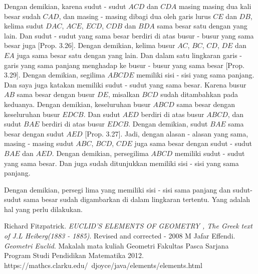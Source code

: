 \documentclass[a4paper]{book}
\begin{document}
Dengan demikian, karena sudut - sudut $ACD$ dan $CDA$ masing masing dua kali
besar  sudah $CAD$, dan masing - masing dibagi dua oleh garis lurus $CE$ dan 
$DB$, kelima sudut $DAC$, $ACE$, $ECD$, $CDB$ dan $BDA$ sama besar satu
dengan yang lain. Dan sudut - sudut yang sama besar berdiri di atas busur -
busur yang sama besar juga [Prop. 3.26]. Dengan demikian, kelima busur $AC$, 
$BC$, $CD$, $DE$ dan $EA$ juga sama besar satu dengan yang lain. Dan dalam 
satu lingkaran garis - garis yang sama panjang menghadap ke busur - busur yang
sama besar [Prop. 3.29].
Dengan demikian, segilima $ABCDE$ memiliki sisi - sisi yang sama panjang. Dan
saya juga katakan memiliki sudut - sudut yang sama besar. Karena busur $AB$ 
sama besar dengan busur $DE$, misalkan $BCD$ sudah ditambahkan pada keduanya.
Dengan demikian, keseluruhan busur $ABCD$ sama besar dengan keseluruhan 
busur $EDCB$.  Dan sudut $AED$ berdiri di atas busur $ABCD$, dan sudut $BAE$
berdiri di atas busur $EDCB$. Dengan demikian, sudut $BAE$ sama besar dengan
sudut $AED$ [Prop. 3.27]. Jadi, dengan alasan - alasan yang sama, masing - 
masing sudut $ABC$, $BCD$, $CDE$ juga sama besar dengan sudut - sudut $BAE$
dan $AED$. Dengan demikian, persegilima $ABCD$ memiliki sudut - sudut yang
sama besar. Dan juga sudah ditunjukkan memiliki sisi - sisi yang sama panjang.

Dengan demikian, persegi lima yang memiliki sisi - sisi sama panjang dan 
sudut- sudut sama besar sudah digambarkan di dalam lingkaran tertentu. Yang
adalah hal yang perlu dilakukan.


\begin{thebibliography}{9} 
Richard Fitzpatrick.
\textit{EUCLID’S ELEMENTS OF GEOMETRY , The Greek text of J.L Heiberg(1883 - 1885)}.
Revised and corrected - 2008 
M Jafar Effendi.
\textit{Geometri Euclid}.
Makalah mata kuliah Geometri Fakultas Pasca Sarjana Program Studi Pendidikan Matematika 2012.
https://mathcs.clarku.edu/~djoyce/java/elements/elements.html 
\end{thebibliography}
\end{document}
